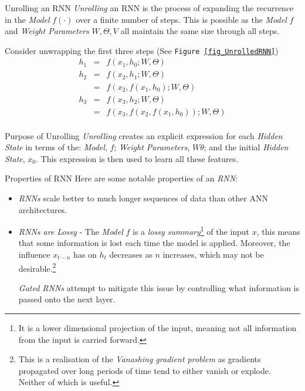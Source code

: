 \documentclass[11pt,a4paper]{article}
\begin{document}
  \begin{proposition}{Unrolling an RNN}
    \textit{Unrolling} an RNN is the process of expanding the recurrence in the \textit{Model} $f(\cdot)$ over a finite number of steps. This is possible as the \textit{Model} $f$ and \textit{Weight Parameters} $W,\Theta,V$ all maintain the same size through all steps.
    \par Consider unwrapping the first three steps (See \texttt{Figure \ref{fig_UnrolledRNN}})
    \[\begin{array}{rcl}
      h_1&=&f(x_1,h_0;W,\Theta)\\
      h_2&=&f(x_2,h_1;W,\Theta)\\
         &=&f(x_2,f(x_1,h_0);W,\Theta)\\
      h_3&=&f(x_3,h_2;W,\Theta)\\
         &=&f(x_3,f(x_2,f(x_1,h_0));W,\Theta)\\
    \end{array}\]
  \end{proposition}

  \begin{remark}{Purpose of Unrolling}
    \textit{Unrolling} creates an explicit expression for each \textit{Hidden State} in terms of the: \textit{Model}, $f$; \textit{Weight Parameters}, $W\theta$; and the initial \textit{Hidden State}, $x_0$. This expression is then used to learn all these features.
  \end{remark}

  \begin{remark}{Properties of RNN}
    Here are some notable properties of an \textit{RNN}:
    \begin{itemize}
      \item \textit{RNNs} scale better to much longer sequences of data than other ANN architectures.
      \item \textit{RNNs are Lossy} - The \textit{Model} $f$ is a \textit{lossy summary}\footnote{It is a lower dimensional projection of the input, meaning not all information from the input is carried forward.} of the input $x$, this means that some information is lost each time the model is applied. Moreover, the influence $x_{t-n}$ has on $h_t$ decreases as $n$ increases, which may not be desirable.\footnote{This is a realisation of the \textit{Vanashing gradient problem} as gradients propagated over long periods of time tend to either vanish or explode. Neither of which is useful.}
      \par \textit{Gated RNNs} attempt to mitigate this issue by controlling what information is passed onto the next layer.
    \end{itemize}
  \end{remark}
\end{document}
